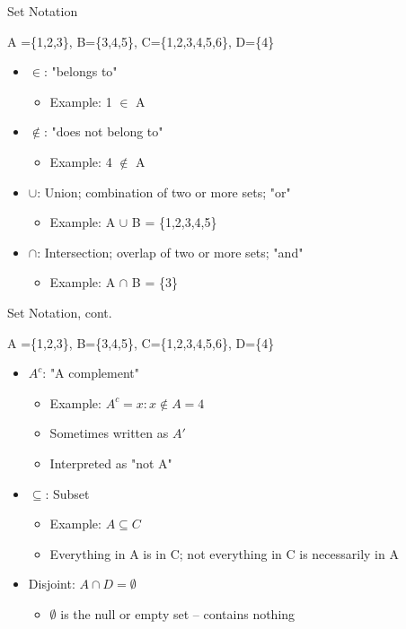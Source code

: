 \documentclass{beamer}
\begin{document}
\begin{frame}{Set Notation}
	
	A =\{1,2,3\}, B=\{3,4,5\}, C=\{1,2,3,4,5,6\}, D=\{4\}
	
	\begin{itemize}
		\item $\in$: "belongs to"
		      \begin{itemize}
		      	\item Example: 1 $\in$ A
		      \end{itemize}
		\item $\notin$: "does not belong to"
		      \begin{itemize}
		      	\item Example: 4 $\notin$ A
		      \end{itemize}
		\item $\cup$: Union; combination of two or more sets; "or"
		      \begin{itemize}
		      	\item Example: A $\cup$ B = \{1,2,3,4,5\}
		      \end{itemize}
		\item $\cap$: Intersection; overlap of two or more sets; "and"
		      \begin{itemize}
		      	\item Example: A $\cap$ B = \{3\}
		      \end{itemize}
	\end{itemize}
\end{frame}


\begin{frame}{Set Notation, cont.}
	
	A =\{1,2,3\}, B=\{3,4,5\}, C=\{1,2,3,4,5,6\}, D=\{4\}
	
	\begin{itemize}
		\item $A^c$: "A complement"
		      \begin{itemize}
		      	\item Example: $A^c = {x: x \notin A} = {4}$
		      	\item Sometimes written as $A'$
		      	\item Interpreted as "not A"
		      \end{itemize}
		\item $\subseteq$: Subset
		      \begin{itemize}
		      	\item Example: $A \subseteq C$
		      	\item Everything in A is in C; not everything in C is necessarily in A
		      \end{itemize}
		\item Disjoint: $A \cap D= \emptyset$
		      \begin{itemize}
		      	\item $\emptyset$ is the null or empty set -- contains nothing 
		      \end{itemize}
	\end{itemize}
	
\end{frame}
\end{document}
